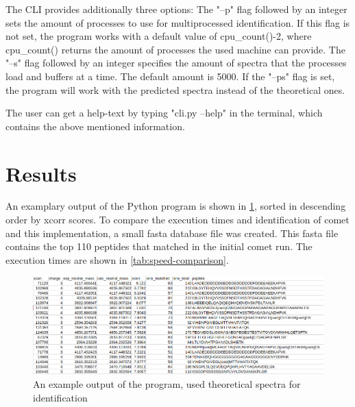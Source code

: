 \documentclass[11pt]{article}
\begin{document}
The CLI provides additionally three options: The "--p" flag followed by an integer sets the amount of processes to use for multiprocessed identification. If this flag is not set, the program works with a default value of cpu\_count()-2, where cpu\_count() returns the amount of processes the used machine can provide. The "--s" flag followed by an integer specifies the amount of spectra that the processes load and buffers at a time. The default amount is 5000. If the "--ps" flag is set, the program will work with the predicted spectra instead of the theoretical ones.

The user can get a help-text by typing "cli.py --help" in the terminal, which contains the above mentioned information.

\section{Results}
An examplary output of the Python program is shown in \cref{fig:output}, sorted in descending order by xcorr scores.
To compare the execution times and identification of comet and this implementation, a small fasta database file was created. This fasta file contains the top 110 peptides that matched in the initial comet run. The execution times are shown in \cref{tab:speed-comparison}. 
\begin{figure}[ht]
\centering
\includegraphics[width=1\textwidth]{figs/output.png}
\caption{An example output of the program, used theoretical spectra for identification}
\label{fig:output}
\end{figure}
\end{document}
